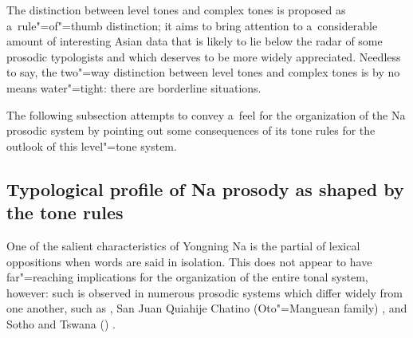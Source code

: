 The distinction
between level tones and complex tones is proposed as a~rule"=of"=thumb distinction; it aims to
bring attention to a~considerable amount of interesting Asian data that is likely to lie below the
radar of some prosodic typologists and which deserves to be more widely appreciated. Needless to say, the two"=way distinction between level tones and complex tones is by no means
water"=tight: there are borderline situations. 

The following subsection attempts to convey a~feel for the organization of the Na prosodic system by pointing out some consequences of its tone rules for the outlook of this level"=tone system.


\subsection[Typological profile of Na prosody]{Typological profile of Na prosody as shaped by the tone rules}
\label{sec:tonalrules}


One of the salient characteristics of Yongning Na is the partial  of lexical oppositions when words are said in isolation. This does not appear to have far"=reaching implications for the organization of the entire tonal system, however: such  is observed in numerous prosodic systems which differ widely from one another, such as  \citep{kubozono1993}, San Juan Quiahije Chatino
(Oto"=Manguean family) \citep[91]{cruz2011}, and Sotho and Tswana () \citep{creisselsetal1997, zerbianetal2010b, zerbian2016}. 

